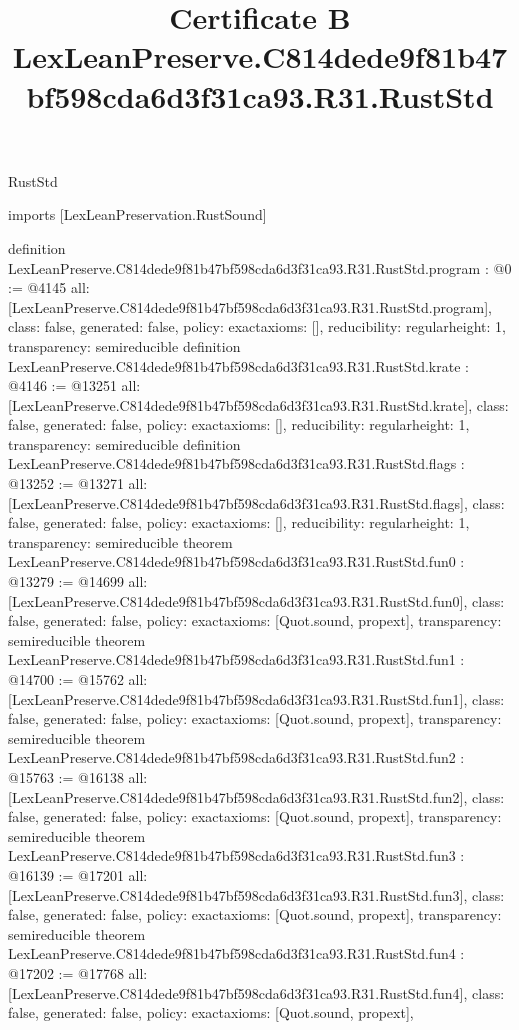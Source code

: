\begin{lexlean}{RustStd}
\title{Certificate B LexLeanPreserve.C814dede9f81b47bf598cda6d3f31ca93.R31.RustStd}
\begin{coremodule}
imports [LexLeanPreservation.RustSound]

definition LexLeanPreserve.C814dede9f81b47bf598cda6d3f31ca93.R31.RustStd.program : @0 := @4145 {
  all: [LexLeanPreserve.C814dede9f81b47bf598cda6d3f31ca93.R31.RustStd.program],
  class: false,
  generated: false,
  policy: exact{axioms: []},
  reducibility: regular{height: 1},
  transparency: semireducible
}
definition LexLeanPreserve.C814dede9f81b47bf598cda6d3f31ca93.R31.RustStd.krate : @4146 := @13251 {
  all: [LexLeanPreserve.C814dede9f81b47bf598cda6d3f31ca93.R31.RustStd.krate],
  class: false,
  generated: false,
  policy: exact{axioms: []},
  reducibility: regular{height: 1},
  transparency: semireducible
}
definition LexLeanPreserve.C814dede9f81b47bf598cda6d3f31ca93.R31.RustStd.flags : @13252 := @13271 {
  all: [LexLeanPreserve.C814dede9f81b47bf598cda6d3f31ca93.R31.RustStd.flags],
  class: false,
  generated: false,
  policy: exact{axioms: []},
  reducibility: regular{height: 1},
  transparency: semireducible
}
theorem LexLeanPreserve.C814dede9f81b47bf598cda6d3f31ca93.R31.RustStd.fun0 : @13279 := @14699 {
  all: [LexLeanPreserve.C814dede9f81b47bf598cda6d3f31ca93.R31.RustStd.fun0],
  class: false,
  generated: false,
  policy: exact{axioms: [Quot.sound, propext]},
  transparency: semireducible
}
theorem LexLeanPreserve.C814dede9f81b47bf598cda6d3f31ca93.R31.RustStd.fun1 : @14700 := @15762 {
  all: [LexLeanPreserve.C814dede9f81b47bf598cda6d3f31ca93.R31.RustStd.fun1],
  class: false,
  generated: false,
  policy: exact{axioms: [Quot.sound, propext]},
  transparency: semireducible
}
theorem LexLeanPreserve.C814dede9f81b47bf598cda6d3f31ca93.R31.RustStd.fun2 : @15763 := @16138 {
  all: [LexLeanPreserve.C814dede9f81b47bf598cda6d3f31ca93.R31.RustStd.fun2],
  class: false,
  generated: false,
  policy: exact{axioms: [Quot.sound, propext]},
  transparency: semireducible
}
theorem LexLeanPreserve.C814dede9f81b47bf598cda6d3f31ca93.R31.RustStd.fun3 : @16139 := @17201 {
  all: [LexLeanPreserve.C814dede9f81b47bf598cda6d3f31ca93.R31.RustStd.fun3],
  class: false,
  generated: false,
  policy: exact{axioms: [Quot.sound, propext]},
  transparency: semireducible
}
theorem LexLeanPreserve.C814dede9f81b47bf598cda6d3f31ca93.R31.RustStd.fun4 : @17202 := @17768 {
  all: [LexLeanPreserve.C814dede9f81b47bf598cda6d3f31ca93.R31.RustStd.fun4],
  class: false,
  generated: false,
  policy: exact{axioms: [Quot.sound, propext]},
}
\end{coremodule}
\end{lexlean}

